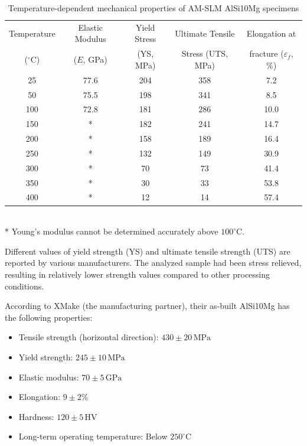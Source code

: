\begin{table}[htbp]
    \centering
    \caption{Temperature-dependent mechanical properties of AM-SLM AlSi10Mg specimens}
    \begin{tabular}{ccccc}
        \hline
        Temperature & Elastic Modulus & Yield Stress & Ultimate Tensile & Elongation at \\
        ($^{\circ}$C) & ($E$, GPa) & (YS, MPa) & Stress (UTS, MPa) & fracture ($\varepsilon_f$, \%) \\
        \hline
        25 & 77.6 & 204 & 358 & 7.2 \\
        50 & 75.5 & 198 & 341 & 8.5 \\
        100 & 72.8 & 181 & 286 & 10.0 \\
        150 & * & 182 & 241 & 14.7 \\
        200 & * & 158 & 189 & 16.4 \\
        250 & * & 132 & 149 & 30.9 \\
        300 & * & 70 & 73 & 41.4 \\
        350 & * & 30 & 33 & 53.8 \\
        400 & * & 12 & 14 & 57.4 \\
        \hline
    \end{tabular}
    \label{tab:alsi10mg_properties}
    \\ \small{* Young's modulus cannot be determined accurately above $100^{\circ}$C.}
\end{table}

Different values of yield strength (YS) and ultimate tensile strength (UTS) are reported by various manufacturers. The analyzed sample had been stress relieved, resulting in relatively lower strength values compared to other processing conditions. 

According to XMake (the manufacturing partner), their as-built AlSi10Mg has the following properties:

\begin{itemize}
    \item Tensile strength (horizontal direction): $430 \pm 20\,\text{MPa}$
    \item Yield strength: $245 \pm 10\,\text{MPa}$
    \item Elastic modulus: $70 \pm 5\,\text{GPa}$
    \item Elongation: $9 \pm 2\%$
    \item Hardness: $120 \pm 5\,\text{HV}$
    \item Long-term operating temperature: Below $250^{\circ}\text{C}$
\end{itemize}


